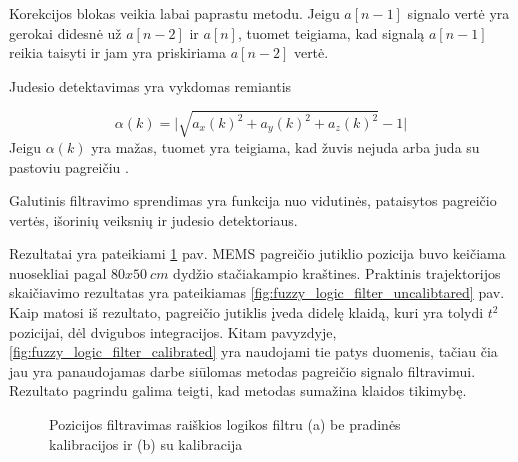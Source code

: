 Korekcijos blokas veikia labai paprastu metodu. Jeigu $a[n-1]$ signalo vertė yra gerokai didesnė už $a[n-2]$ ir $a[n]$, tuomet teigiama, kad signalą $a[n-1]$ reikia taisyti ir jam yra priskiriama $a[n-2]$ vertė. 

Judesio detektavimas yra vykdomas remiantis

\begin{equation}
    \alpha(k) = \Big| \sqrt{a_x(k)^2 + a_y(k)^2 + a_z(k)^2} - 1\Big|
\end{equation}
Jeigu $\alpha(k)$ yra mažas, tuomet yra teigiama, kad žuvis nejuda arba juda su pastoviu pagreičiu \cite{yoo2011gain}.

Galutinis filtravimo sprendimas yra funkcija nuo vidutinės, pataisytos pagreičio vertės, išorinių veiksnių ir judesio detektoriaus.

Rezultatai yra pateikiami \ref{fig:fuzzy_logic_filter} pav. MEMS pagreičio jutiklio pozicija buvo keičiama nuosekliai pagal $80x50~cm$ dydžio stačiakampio kraštines. Praktinis trajektorijos skaičiavimo rezultatas yra pateikiamas \ref{fig:fuzzy_logic_filter_uncalibtared} pav. Kaip matosi iš rezultato, pagreičio jutiklis įveda didelę klaidą, kuri yra tolydi $t^2$ pozicijai, dėl dvigubos integracijos. Kitam pavyzdyje, \ref{fig:fuzzy_logic_filter_calibrated} yra naudojami tie patys duomenis, tačiau čia jau yra panaudojamas darbe siūlomas metodas pagreičio signalo filtravimui. Rezultato pagrindu galima teigti, kad metodas sumažina klaidos tikimybę.

\begin{figure}[H]
    \centering
    \caption{Pozicijos filtravimas raiškios logikos filtru (a) be pradinės kalibracijos ir (b) su kalibracija \cite{yoo2011fuzzy}}
    \label{fig:fuzzy_logic_filter}
\end{figure}

